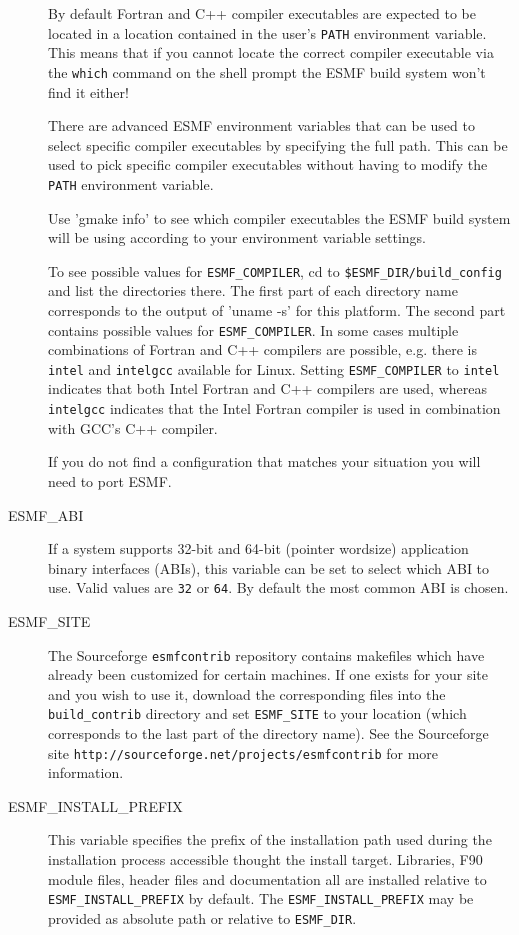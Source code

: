 \begin{description}
By default Fortran and C++ compiler executables are expected to be located in
a location contained in the user's {\tt PATH} environment variable. This means
that if you cannot locate the correct compiler executable via the {\tt which}
command on the shell prompt the ESMF build system won't find it either!

There are advanced ESMF environment variables that can be used to select 
specific compiler executables by specifying the full path. This can be used to
pick specific compiler executables without having to modify the {\tt PATH}
environment variable.

Use 'gmake info' to see which compiler executables the ESMF build system will
be using according to your environment variable settings.

To see possible values for {\tt ESMF\_COMPILER}, cd to 
{\tt \$ESMF\_DIR/build\_config} and list the directories there. The first part 
of each directory name corresponds to the output of 'uname -s' for this 
platform. The second part contains possible values for {\tt ESMF\_COMPILER}. In
some cases multiple combinations of Fortran and C++ compilers are possible, e.g.
there is {\tt intel} and {\tt intelgcc} available for Linux. Setting 
{\tt ESMF\_COMPILER} to {\tt intel} indicates that both Intel Fortran and 
C++ compilers are used, whereas {\tt intelgcc} indicates that the Intel Fortran
compiler is used in combination with GCC's C++ compiler.

If you do not find a configuration that matches your situation you will need to
port ESMF.

\item[ESMF\_ABI]
If a system supports 32-bit and 64-bit (pointer wordsize) application binary
interfaces (ABIs), this variable can be set to select which ABI to use. Valid 
values are {\tt 32} or {\tt 64}. By default the most common ABI is chosen.

\item[ESMF\_SITE]
The Sourceforge {\tt esmfcontrib} repository contains makefiles which have 
already been customized for certain machines.  If one exists for your site 
and you wish to use it, download the corresponding files into the 
{\tt build\_contrib} directory and set {\tt ESMF\_SITE} to your location
(which corresponds to the last part of the directory name).  See the 
Sourceforge site {\tt http://sourceforge.net/projects/esmfcontrib} for more 
information.

\item[ESMF\_INSTALL\_PREFIX]
This variable specifies the prefix of the installation path used during the
installation process accessible thought the install target. Libraries, F90
module files, header files and documentation all are installed relative to
{\tt ESMF\_INSTALL\_PREFIX} by default. The {\tt ESMF\_INSTALL\_PREFIX} may be
provided as absolute path or relative to {\tt ESMF\_DIR}.

\end{description}

